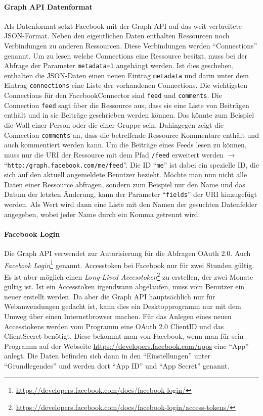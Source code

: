 \paragraph{Graph API Datenformat} %
\label{par:graph_api_datenformat}

Als Datenformat setzt Facebook mit der Graph API auf das weit verbreitete JSON-Format. Neben den eigentlichen Daten enthalten Ressourcen noch Verbindungen zu anderen Ressourcen. Diese Verbindungen werden \enquote{Connections} genannt. Um zu lesen welche Connections eine Ressource besitzt, muss bei der Abfrage der Parameter \texttt{metadata=1} angehängt werden. Ist dies geschehen, enthalten die JSON-Daten einen neuen Eintrag \texttt{metadata} und darin unter dem Eintrag \texttt{connections} eine Liste der vorhandenen Connections. Die wichtigsten Connections für den FacebookConnector sind \texttt{feed} und \texttt{comments}. Die Connection \texttt{feed} sagt über die Ressource aus, dass sie eine Liste von Beiträgen enthält und in sie Beiträge geschrieben werden können. Das könnte zum Beispiel die Wall einer Person oder die einer Gruppe sein. Dahingegen zeigt die Connection \texttt{comments} an, dass die betreffende Ressource Kommentare enthält und auch kommentiert werden kann. Um die Beiträge eines Feeds lesen zu können, muss nur die URI der Ressource mit dem Pfad \texttt{/feed} erweitert werden $\rightarrow$ \enquote{\texttt{http:/graph.facebook.com/me/feed}}. Die ID \enquote{\texttt{me}} ist dabei ein spezielle ID, die sich auf den aktuell angemeldete Benutzer bezieht. Möchte man nun nicht alle Daten einer Ressource abfragen, sondern zum Beispiel nur den Name und das Datum der letzten Änderung, kann der Parameter \enquote{\texttt{fields}} der URI hinzugefügt werden. Als Wert wird dann eine Liste mit den Namen der gesuchten Datenfelder angegeben, wobei jeder Name durch ein Komma getrennt wird. 


\paragraph{Facebook Login} %
\label{par:facebook_login}

Die Graph API verwendet zur Autorisierung für die Abfragen OAuth 2.0. Auch \emph{Facebook Login}\footnote{\url{https://developers.facebook.com/docs/facebook-login/}} genannt. Accesstoken bei Facebook nur für zwei Stunden gültig. Es ist aber möglich einen \emph{Long-Lived Accesstoken}\footnote{\url{https://developers.facebook.com/docs/facebook-login/access-tokens/}} zu erstellen, der zwei Monate gültig ist. Ist ein Accesstoken irgendwann abgelaufen, muss vom Benutzer ein neuer erstellt werden. Da aber die Graph API hauptsächlich nur für Webanwendungen gedacht ist, kann dies ein Desktopprogramm nur mit dem Umweg über einen Internetbrowser machen. Für das Anlegen eines neuen Accesstokens werden vom Programm eine OAuth 2.0 ClientID und das ClientSecret benötigt. Diese bekommt man von Facebook, wenn man für sein Programm auf der Webseite \url{https://developers.facebook.com/apps} eine \enquote{App} anlegt. Die Daten befinden sich dann in den \enquote{Einstellungen} unter \enquote{Grundlegendes} und werden dort \enquote{App ID} und \enquote{App Secret} genannt.

